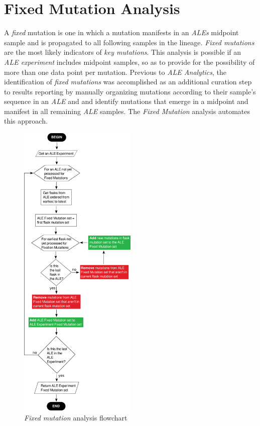 \documentclass[12pt,final,masters,chapterheads]{ucsd}  %
\begin{document}
\section{Fixed Mutation Analysis}

A \textit{fixed} mutation is one in which a mutation manifests in an \textit{ALEs} midpoint sample and is propagated to all following samples in the lineage. \textit{Fixed mutations} are the most likely indicators of \textit{key mutations}. This analysis is possible if an \textit{ALE experiment} includes midpoint samples, so as to provide for the possibility of more than one data point per mutation. Previous to \textit{ALE Analytics}, the identification of \textit{fixed mutations} was accomplished as an additional curation step to results reporting by manually organizing mutations according to their sample's sequence in an \textit{ALE} and and identify mutations that emerge in a midpoint and manifest in all remaining \textit{ALE} samples. The \textit{Fixed Mutation} analysis automates this approach.

\begin{figure}[H]
  \caption{\textit{Fixed mutation} analysis flowchart}
  \centering
  \includegraphics[width=0.50\textwidth]{fixation_mutation_flowchart.png}
\end{figure}
\end{document}
